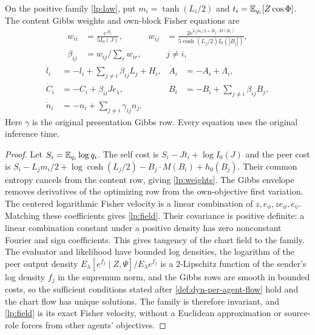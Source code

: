 On the positive family \cref{lp:law}, put $m_i=\tanh(L_i/2)$ and $t_i=\mathbb E_{q_i}[Z\cos\Phi]$. The content Gibbs weights and own-block Fisher equations are
\begin{equation}
 \begin{aligned}
 w_{ii}&=\frac{e^{Jt_i}}{5I_0(J)},&
 w_{ij}&=\frac{2e^{L_jm_i/2+B_j\cdot M(B_i)}}
 {5\cosh(L_j/2)I_0(|B_j|)},\\
 \beta_{ij}&=w_{ij}/\sum_r w_{ir},&& j\ne i,
 \end{aligned}
 \label{lp:weights}
\end{equation}
\begin{equation}
 \begin{aligned}
 \dot l_i&=-l_i+\sum_{j\ne i}\beta_{ij}L_j+H_i,&
 \dot A_i&=-A_i+\Lambda_i,\\
 \dot C_i&=-C_i+\beta_{ii}Je_1,&
 \dot B_i&=-B_i+\sum_{j\ne i}\beta_{ij}B_j,\\
 \dot n_i&=-n_i+\sum_{j\ne i}\gamma_{ij}n_j.
 \end{aligned}
 \label{lp:field}
\end{equation}
Here $\gamma$ is the original presentation Gibbs row. Every equation uses the original inference time.
\begin{proof}
Let $S_i=\mathbb E_{q_i}\log q_i$. The self cost is $S_i-Jt_i+\log I_0(J)$ and the peer cost is
$S_i-L_jm_i/2+\log\cosh(L_j/2)-B_j\cdot M(B_i)+h_0(B_j)$.
Their common entropy cancels from the content row, giving \cref{lp:weights}. The Gibbs envelope removes derivatives of the optimizing row from the own-objective first variation. The centered logarithmic Fisher velocity is a linear combination of $z,e_\phi,ze_\phi,e_\psi$. Matching these coefficients gives \cref{lp:field}. Their covariance is positive definite: a linear combination constant under a positive density has zero nonconstant Fourier and sign coefficients. This gives tangency of the chart field to the family. The evaluator and likelihood have bounded log densities, the logarithm of the peer output density $E_\lambda[e^{f_j}\mid Z,\Psi]/E_\lambda e^{f_j}$ is a $2$-Lipschitz function of the sender's log density $f_j$ in the supremum norm, and the Gibbs rows are smooth in bounded costs, so the sufficient conditions stated after \cref{def:dyn-per-agent-flow} hold and the chart flow has unique solutions. The family is therefore invariant, and \cref{lp:field} is its exact Fisher velocity, without a Euclidean approximation or source-role forces from other agents' objectives.
\end{proof}

